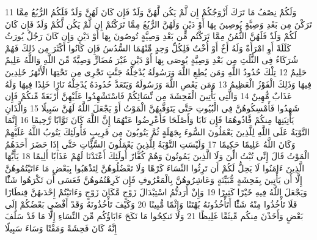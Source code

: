 {\tiny\colorbox{cl_aya}{11}} وَلَكُمْ نِصْفُ مَا تَرَكَ أَزْوَجُكُمْ إِن لَّمْ يَكُن لَّهُنَّ وَلَدٌ فَإِن كَانَ لَهُنَّ وَلَدٌ فَلَكُمُ الرُّبُعُ مِمَّا تَرَكْنَ مِن بَعْدِ وَصِيَّةٍ يُوصِينَ بِهَا أَوْ دَيْنٍ وَلَهُنَّ الرُّبُعُ مِمَّا تَرَكْتُمْ إِن لَّمْ يَكُن لَّكُمْ وَلَدٌ فَإِن كَانَ لَكُمْ وَلَدٌ فَلَهُنَّ الثُّمُنُ مِمَّا تَرَكْتُم مِّن بَعْدِ وَصِيَّةٍ تُوصُونَ بِهَا أَوْ دَيْنٍ وَإِن كَانَ رَجُلٌ يُورَثُ كَلَلَةً أَوِ امْرَأَةٌ وَلَهُ أَخٌ أَوْ أُخْتٌ فَلِكُلِّ وَحِدٍ مِّنْهُمَا السُّدُسُ فَإِن كَانُوا أَكْثَرَ مِن ذَلِكَ فَهُمْ شُرَكَاءُ فِى الثُّلُثِ مِن بَعْدِ وَصِيَّةٍ يُوصَى بِهَا أَوْ دَيْنٍ غَيْرَ مُضَارٍّ وَصِيَّةً مِّنَ اللَّهِ وَاللَّهُ عَلِيمٌ حَلِيمٌ
{\tiny\colorbox{cl_aya}{12}} تِلْكَ حُدُودُ اللَّهِ وَمَن يُطِعِ اللَّهَ وَرَسُولَهُ يُدْخِلْهُ جَنَّتٍ تَجْرِى مِن تَحْتِهَا الْأَنْهَرُ خَلِدِينَ فِيهَا وَذَلِكَ الْفَوْزُ الْعَظِيمُ
{\tiny\colorbox{cl_aya}{13}} وَمَن يَعْصِ اللَّهَ وَرَسُولَهُ وَيَتَعَدَّ حُدُودَهُ يُدْخِلْهُ نَارًا خَلِدًا فِيهَا وَلَهُ عَذَابٌ مُّهِينٌ
{\tiny\colorbox{cl_aya}{14}} وَالَّتِى يَأْتِينَ الْفَحِشَةَ مِن نِّسَائِكُمْ فَاسْتَشْهِدُوا عَلَيْهِنَّ أَرْبَعَةً مِّنكُمْ فَإِن شَهِدُوا فَأَمْسِكُوهُنَّ فِى الْبُيُوتِ حَتَّى يَتَوَفَّىهُنَّ الْمَوْتُ أَوْ يَجْعَلَ اللَّهُ لَهُنَّ سَبِيلًا
{\tiny\colorbox{cl_aya}{15}} وَالَّذَانِ يَأْتِيَنِهَا مِنكُمْ فََٔاذُوهُمَا فَإِن تَابَا وَأَصْلَحَا فَأَعْرِضُوا عَنْهُمَا إِنَّ اللَّهَ كَانَ تَوَّابًا رَّحِيمًا
{\tiny\colorbox{cl_aya}{16}} إِنَّمَا التَّوْبَةُ عَلَى اللَّهِ لِلَّذِينَ يَعْمَلُونَ السُّوءَ بِجَهَلَةٍ ثُمَّ يَتُوبُونَ مِن قَرِيبٍ فَأُولَئِكَ يَتُوبُ اللَّهُ عَلَيْهِمْ وَكَانَ اللَّهُ عَلِيمًا حَكِيمًا
{\tiny\colorbox{cl_aya}{17}} وَلَيْسَتِ التَّوْبَةُ لِلَّذِينَ يَعْمَلُونَ السَّئَِّاتِ حَتَّى إِذَا حَضَرَ أَحَدَهُمُ الْمَوْتُ قَالَ إِنِّى تُبْتُ الَْٔنَ وَلَا الَّذِينَ يَمُوتُونَ وَهُمْ كُفَّارٌ أُولَئِكَ أَعْتَدْنَا لَهُمْ عَذَابًا أَلِيمًا
{\tiny\colorbox{cl_aya}{18}} يَأَيُّهَا الَّذِينَ ءَامَنُوا لَا يَحِلُّ لَكُمْ أَن تَرِثُوا النِّسَاءَ كَرْهًا وَلَا تَعْضُلُوهُنَّ لِتَذْهَبُوا بِبَعْضِ مَا ءَاتَيْتُمُوهُنَّ إِلَّا أَن يَأْتِينَ بِفَحِشَةٍ مُّبَيِّنَةٍ وَعَاشِرُوهُنَّ بِالْمَعْرُوفِ فَإِن كَرِهْتُمُوهُنَّ فَعَسَى أَن تَكْرَهُوا شَئًْا وَيَجْعَلَ اللَّهُ فِيهِ خَيْرًا كَثِيرًا
{\tiny\colorbox{cl_aya}{19}} وَإِنْ أَرَدتُّمُ اسْتِبْدَالَ زَوْجٍ مَّكَانَ زَوْجٍ وَءَاتَيْتُمْ إِحْدَىهُنَّ قِنطَارًا فَلَا تَأْخُذُوا مِنْهُ شَئًْا أَتَأْخُذُونَهُ بُهْتَنًا وَإِثْمًا مُّبِينًا
{\tiny\colorbox{cl_aya}{20}} وَكَيْفَ تَأْخُذُونَهُ وَقَدْ أَفْضَى بَعْضُكُمْ إِلَى بَعْضٍ وَأَخَذْنَ مِنكُم مِّيثَقًا غَلِيظًا
{\tiny\colorbox{cl_aya}{21}} وَلَا تَنكِحُوا مَا نَكَحَ ءَابَاؤُكُم مِّنَ النِّسَاءِ إِلَّا مَا قَدْ سَلَفَ إِنَّهُ كَانَ فَحِشَةً وَمَقْتًا وَسَاءَ سَبِيلًا
